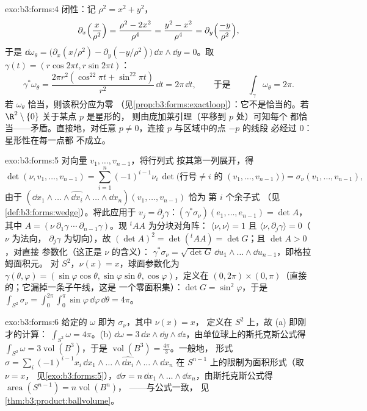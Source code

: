 \begin{solution}{exo:b3:forms:4}
闭性：记 $\rho^2 = x^2 + y^2$，
\[
\partial_x\Bigl(\frac{x}{\rho^2}\Bigr) = \frac{\rho^2 -
2x^2}{\rho^4} = \frac{y^2 - x^2}{\rho^4} =
\partial_y\Bigl(\frac{-y}{\rho^2}\Bigr),
\]
于是 $\dd\omega_\theta = \bigl(\partial_x(x/\rho^2) -
\partial_y(-y/\rho^2)\bigr)\,\dd x\wedge\dd y = 0$。取
$\gamma(t) = (r\cos2\pi t, r\sin2\pi t)$：
\[
\gamma^*\omega_\theta = \frac{2\pi r^2(\cos^22\pi t +
\sin^22\pi t)}{r^2}\,\dd t = 2\pi\,\dd t,
\qquad\text{于是}\qquad
\int_\gamma\omega_\theta = 2\pi .
\] 若 $\omega_\theta$
恰当，则该积分应为零
（见\cref{prop:b3:forms:exactloop}）：它不是恰当的。若
$\R^2\setminus\{0\}$ 关于某点 $p$ 是星形的，
则由庞加莱引理（平移到 $p$ 处）可知每个
都恰当——矛盾。直接地，对任意 $p
\neq 0$，连接 $p$ 与区域中的点 $-p$ 的线段
必经过 $0$：星形性在每一点都
不成立。
\end{solution}

\begin{solution}{exo:b3:forms:5}
对向量 $v_1, \dots, v_{n-1}$，将行列式
按其第一列展开，得
\[
\det(\nu, v_1, \dots, v_{n-1}) =
\sum_{i=1}^n(-1)^{i-1}\nu_i\,
\det\bigl(\text{行号} \neq i \text{ 的 } (v_1, \dots,
v_{n-1})\bigr)
= \sigma_\nu(v_1, \dots, v_{n-1}),
\]
由于 $(\dd x_1\wedge\dots\wedge\widehat{\dd
x_i}\wedge\dots\wedge\dd x_n)(v_1, \dots, v_{n-1})$ 恰为
第 $i$ 个余子式
（见\cref{def:b3:forms:wedge}）。将此应用于 $v_j =
\partial_j\gamma$：$(\gamma^*\sigma_\nu)(e_1, \dots,
e_{n-1}) = \det A$，其中 $A = (\nu\ \partial_1\gamma\ \cdots\
\partial_{n-1}\gamma)$。现 ${}^t\!AA$ 为分块对角阵：
$\langle\nu, \nu\rangle = 1$ 且 $\langle\nu,
\partial_j\gamma\rangle = 0$（$\nu$ 为法向，
$\partial_j\gamma$ 为切向），故 $(\det A)^2 =
\det({}^t\!AA) = \det G$；且 $\det A > 0$，对直接
参数化（这正是 $\nu$ 的含义）：
$\gamma^*\sigma_\nu = \sqrt{\det G}\,\dd
u_1\wedge\dots\wedge\dd u_{n-1}$，即格拉姆面积元。
对 $S^2$，$\nu(x) = x$，球面参数化为
$\gamma(\theta, \varphi) = (\sin\varphi\cos\theta,
\sin\varphi\sin\theta, \cos\varphi)$，定义在
$(0,2\pi)\times(0,\pi)$（直接的；它漏掉一条子午线，这是
一个零面积集）：$\det G = \sin^2\varphi$，于是
$\int_{S^2}\sigma_\nu =
\int_0^{2\pi}\!\!\int_0^\pi\sin\varphi\,\dd\varphi\,
\dd\theta = 4\pi$。
\end{solution}

\begin{solution}{exo:b3:forms:6}
给定的 $\omega$ 即为 $\sigma_\nu$，其中 $\nu(x) = x$，
定义在 $S^2$ 上，故 (a) 即刚才的计算：
$\int_{S^2}\omega = 4\pi$。(b) $\dd\omega = 3\,\dd
x\wedge\dd y\wedge\dd z$，由单位球上的斯托克斯公式得
$\int_{S^2}\omega = 3\operatorname{vol}(B^3)$，于是
$\operatorname{vol}(B^3) = \frac{4\pi}3$。一般地，
形式 $\sigma = \sum_i(-1)^{i-1}x_i\,\dd
x_1\wedge\dots\wedge\widehat{\dd x_i}\wedge\dots\wedge\dd
x_n$ 在 $S^{n-1}$ 上的限制为面积形式（取 $\nu = x$，
见\cref{exo:b3:forms:5}），$\dd\sigma = n\,\dd
x_1\wedge\dots\wedge\dd x_n$，由斯托克斯公式得
$\operatorname{area}(S^{n-1}) = n\operatorname{vol}(B^n)$，
——与公式一致，
见\cref{thm:b3:product:ballvolume}。
\end{solution}

